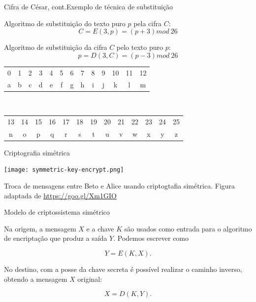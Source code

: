 \begin{frame}{Cifra de César, cont.}{Exemplo de técnica de substituição}

Algoritmo de substituição do texto puro $p$ pela cifra $C$:\\

$$C = E(3, p) = (p+3) mod\ 26$$

Algoritmo de substituição da cifra $C$ pelo texto puro $p$:\\

$$p = D(3, C) = (p-3) mod\ 26$$

\begingroup
\begin{center}
\scriptsize
\begin{tabular}{ccccccccccccc}
0& 1& 2 &3 &4 &5& 6 & 7& 8& 9& 10 & 11 & 12\\
a& b& c &d &e &f& g & h& i& j & k &  l &  m\\
\end{tabular}\\\bigskip
\begin{tabular}{ccccccccccccc}
13& 14& 15 & 16 & 17 & 18 & 19 & 20 & 21 & 22 & 23 & 24 & 25 \\
 n&  o&  p &  q &  r &  s &  t &  u &  v &  w &  x &  y &  z \\
\end{tabular}
\end{center}
\endgroup

\end{frame}



\begin{frame}{Criptografia simétrica}

\begin{center}
\texttt{[image: symmetric-key-encrypt.png]}
\end{center}

\scriptsize Troca de mensagens entre Beto e Alice usando criptogtafia
simétrica. Figura adaptada de \url{https://goo.gl/Xm1GIO}

\end{frame}

\begin{frame}{Modelo de criptossistema simétrico}

Na origem, a mensagem $X$ e a chave $K$ são usados como entrada 
para o algoritmo de encriptação que produz a saída $Y$. Podemos 
escrever como

$$Y = E(K, X).$$

No destino, com a posse da chave secreta é possível realizar o caminho 
inverso, obtendo a mensagem $X$ original:

$$X = D(K ,Y).$$

\end{frame}


